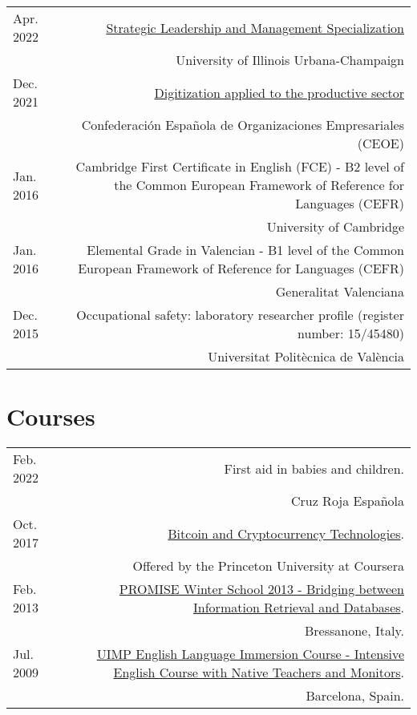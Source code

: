 \documentclass[10pt]{article}
\begin{document}
\begin{tabular}{L!{\VRule}R}
		Apr. 2022 & \href{https://www.coursera.org/account/accomplishments/specialization/certificate/X4K5KTD6P9CH}{Strategic Leadership and Management Specialization}\\
			&\scriptsize{University of Illinois Urbana-Champaign} \vspace{5pt}\\
   		Dec. 2021 & \href{}{Digitization applied to the productive sector}\\
		&\scriptsize{Confederación Española de Organizaciones Empresariales (CEOE)} \vspace{5pt}\\
		Jan. 2016 & Cambridge First Certificate in English (FCE) - B2 level of the Common European Framework of Reference for Languages (CEFR)\\
		&\scriptsize{University of Cambridge} \vspace{5pt}\\
		Jan. 2016 & Elemental Grade in Valencian - B1 level of the Common European Framework of Reference for Languages (CEFR)\\
		&\scriptsize{Generalitat Valenciana} \vspace{5pt}\\
		Dec. 2015 & Occupational safety: laboratory researcher profile (register number: 15/45480)\\
		&\scriptsize{Universitat Polit{\`e}cnica de Val{\`e}ncia} \vspace{5pt}\\
\end{tabular}

\section*{Courses}
\begin{tabular}{L!{\VRule}R}
	Feb. 2022 & First aid in babies and children. \\
	&\scriptsize{Cruz Roja Española}\vspace{5pt}\\

	Oct. 2017 & \href{}{Bitcoin and Cryptocurrency Technologies}. \\
	&\scriptsize{Offered by the Princeton University at Coursera}\vspace{5pt}\\
	
	Feb. 2013 & \href{http://www.promise-noe.eu/events/winter-school-2013/}{PROMISE Winter School 2013 - Bridging between Information Retrieval and Databases}.\\
	&\scriptsize{Bressanone, Italy.} \vspace{5pt}\\

Jul. 2009 & \href{}{UIMP English Language Immersion Course - Intensive English Course with Native Teachers and Monitors}.\\
&\scriptsize{Barcelona, Spain.} \vspace{5pt}\\
\end{tabular}
\end{document}
